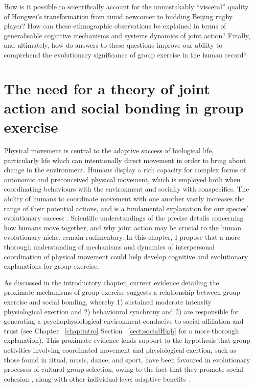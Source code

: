 \begin{CJK}{UTF8}{gbsn}
How is it possible to scientifically account for the unmistakably ``visceral'' quality of Hongwei's transformation from timid newcomer to budding Beijing rugby player?  How can these ethnographic observations be explained in terms of generalisable cognitive mechanisms and systems dynamics of joint action?  Finally, and ultimately, how do answers to these questions improve our ability to comprehend the evolutionary significance of group exercise in the human record?



\section{The need for a theory of joint action and social bonding in group exercise}

Physical movement is central to the adaptive success of biological life, particularly life which can intentionally direct movement in order to bring about change in the environment.  Humans display a rich capacity for complex forms of autonomic and preconceived physical movement, which is employed both when coordinating behaviours with the environment and socially with conspecifics.  The ability of humans to coordinate movement with one another vastly increases the range of their potential actions, and is a fundamental explanation for our species' evolutionary success \citep{Tomasello2009}.  Scientific understandings of the precise details concerning how humans move together, and why joint action may be crucial to the human evolutionary niche, remain rudimentary.  In this chapter, I propose that a more thorough understanding of mechanisms and dynamics of interpersonal coordination of physical movement could help develop cognitive and evolutionary explanations for group exercise.

As discussed in the introductory chapter, current evidence detailing the proximate mechanisms of group exercise suggests a relationship between group exercise and social bonding, whereby 1) sustained moderate intensity physiological exertion and 2) behavioural synchrony and 2) are responsible for generating a psychophysiological environment conducive to social affiliation and trust (see Chapter ~\ref{chap:intro} Section ~\ref{sect:socialHigh} for a more thorough explanation).  This proximate evidence lends support to the hypothesis that group activities involving coordinated movement and physiological exertion, such as those found in ritual, music, dance, and sport, have been favoured in evolutionary processes of cultural group selection, owing to the fact that they promote social cohesion \cite{Dunbar2010}, along with other individual-level adaptive benefits \citep{Cohen2017}.


\end{CJK}
